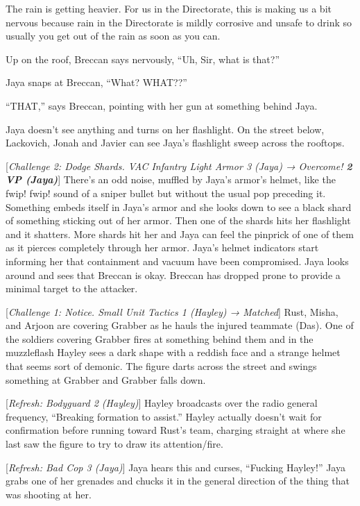 The rain is getting heavier.  For us in the Directorate, this is making us a bit nervous because rain in the Directorate is mildly corrosive and unsafe to drink so usually you get out of the rain as soon as you can.

Up on the roof, Breccan says nervously, ``Uh, Sir, what is that?''

Jaya snaps at Breccan, ``What?  WHAT??''

``THAT,'' says Breccan, pointing with her gun at something behind Jaya.

Jaya doesn't see anything and turns on her flashlight.  On the street below, Lackovich, Jonah and Javier can see Jaya's flashlight sweep across the rooftops.

{[}\textit{Challenge 2: Dodge Shards.  VAC Infantry Light Armor 3 (Jaya) → Overcome! }\textit{\textbf{2 VP (Jaya)}}{]} There's an odd noise, muffled by Jaya's armor's helmet, like the fwip! fwip! sound of a sniper bullet but without the usual pop preceding it.  Something embeds itself in Jaya's armor and she looks down to see a black shard of something sticking out of her armor.  Then one of the shards hits her flashlight and it shatters.  More shards hit her and Jaya can feel the pinprick of one of them as it pierces completely through her armor.  Jaya's helmet indicators start informing her that containment and vacuum have been compromised.  Jaya looks around and sees that Breccan is okay.  Breccan has dropped prone to provide a minimal target to the attacker.



{[}\textit{Challenge 1: Notice.  Small Unit Tactics 1 (Hayley) → Matched}{]}   Rust, Misha, and Arjoon are covering Grabber as he hauls the injured teammate (Das).  One of the soldiers covering Grabber fires at something behind them and in the muzzleflash Hayley sees a dark shape with a reddish face and a strange helmet that seems sort of demonic.  The figure darts across the street and swings something at Grabber and Grabber falls down.



{[}\textit{Refresh: Bodyguard 2 (Hayley)}{]} Hayley broadcasts over the radio general frequency, ``Breaking formation to assist.''  Hayley actually doesn't wait for confirmation before running toward Rust's team, charging straight at where she last saw the figure to try to draw its attention/fire.



{[}\textit{Refresh: Bad Cop 3 (Jaya)}{]} Jaya hears this and curses, ``Fucking Hayley!''  Jaya grabs one of her grenades and chucks it in the general direction of the thing that was shooting at her.



